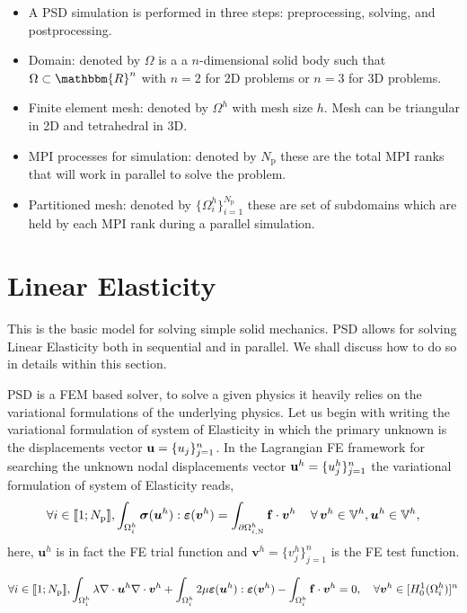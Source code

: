 \documentclass{report}
\newcommand{\bu}{\textbf{u}}
\newcommand{\buh}{\boldsymbol u^h}
\newcommand{\bvh}{\boldsymbol v^h}
\newcommand{\np}{N_\text{p}}
\newcommand{\sig}{\boldsymbol{\sigma}}
\newcommand{\eps}{\boldsymbol{\varepsilon}}
\def\bu{{\bf{u}}}
\begin{document}
\begin{itemize}
    \item A PSD simulation is performed in three steps: preprocessing, solving, and postprocessing. 
    \item Domain: denoted by $\Omega$ is a a $n$-dimensional solid body such that $\Omega \subset \mathbbm{R}^n$ with $n=2$   for 2D problems or  $n=3$ for 3D problems.
    \item Finite element mesh: denoted by $\Omega^h$ with mesh size $h$. Mesh can be triangular in 2D and tetrahedral in 3D.
    \item MPI processes for simulation: denoted by $\np$ these are the total MPI ranks that will work in parallel to solve the problem.
    \item Partitioned mesh: denoted by $\{ \Omega ^h_i \}_{i=1}^{\np}$ these are set of subdomains which are held by each MPI rank during a parallel simulation.
\end{itemize}

\section{Linear Elasticity}
This is the basic model for solving simple solid mechanics. PSD allows for solving Linear Elasticity both in sequential and in parallel. We shall discuss how to do so in details within this section.


PSD is a FEM based solver, to solve a given physics it heavily relies on the variational formulations of the underlying physics. Let us begin with writing the variational formulation of system of  Elasticity in which the primary unknown is the displacements vector $\bu=\{u_j\}^n_{j=1}$. In the Lagrangian FE framework for searching the unknown nodal displacements vector $\bu^h=\{u^h_j\}^n_{j=1}$ the variational formulation of system of  Elasticity reads,
%
%
\begin{equation}\label{Eq:Varf}
\forall i \in \llbracket 1; N_{\text p} \rrbracket,  \int_{\Omega^h_i}\sig(\buh) : \eps(\bvh) = \int_{\partial\Omega^h_{i,\text{N}}} \mathbf{f}\cdot\bvh \, \quad\forall\,\bvh\in\mathbb{V}^h,\buh\in\mathbb{V}^h,
\end{equation}
%
here,  $\buh$ is in fact the FE trial function and $\bvh=\{v^h_j\}^n_{j=1}$ is the FE test function.

\begin{equation}\label{Eq:LinearElasticity}
\forall i \in \llbracket 1; N_{\text p} \rrbracket, 
\int_{\Omega^h_i}\lambda\nabla\cdot\buh\nabla\cdot\bvh + \int_{\Omega^h_i}2\mu\boldsymbol\varepsilon(\buh):\boldsymbol\varepsilon(\bvh)-\int_{\Omega^h_i}\mathbf{f}\cdot\bvh=0, \quad\forall\bvh\in[H^1_0(\Omega^h_i)]^n 
\end{equation}
\end{document}
